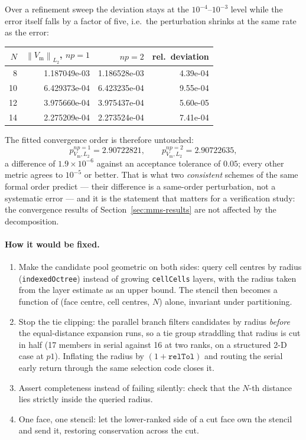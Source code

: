 \documentclass[11pt,a4paper]{article}
\newcommand{\code}[1]{\texttt{\small #1}}
\newcommand{\Vm}{V_{\text{m}}}
\newcommand{\norm}[1]{\left\lVert #1 \right\rVert}
\begin{document}
Over a refinement sweep the deviation stays at the $10^{-4}$--$10^{-3}$ level
while the error itself falls by a factor of five, i.e.\ the perturbation
shrinks at the same rate as the error:

\begin{center}
\begin{tabular}{@{}rrrr@{}}
\toprule
$N$ & $\norm{\Vm}_{L_2}$, $np=1$ & $np=2$ & rel.\ deviation \\
\midrule
 8 & 1.187049e-03 & 1.186528e-03 & 4.39e-04 \\
10 & 6.429373e-04 & 6.423235e-04 & 9.55e-04 \\
12 & 3.975660e-04 & 3.975437e-04 & 5.60e-05 \\
14 & 2.275209e-04 & 2.273524e-04 & 7.41e-04 \\
\bottomrule
\end{tabular}
\end{center}

The fitted convergence order is therefore untouched:
\[
  p^{np=1}_{\Vm,L_2} = 2.90722821,
  \qquad
  p^{np=2}_{\Vm,L_2} = 2.90722635,
\]
a difference of $1.9\times10^{-6}$ against an acceptance tolerance of $0.05$;
every other metric agrees to $10^{-5}$ or better. That is what two
\emph{consistent} schemes of the same formal order predict --- their difference
is a same-order perturbation, not a systematic error --- and it is the
statement that matters for a verification study: the convergence results of
Section~\ref{sec:mms-results} are not affected by the decomposition.

\paragraph{How it would be fixed.}
\begin{enumerate}
  \item Make the candidate pool geometric on both sides: query cell centres by
        radius (\code{indexedOctree}) instead of growing \code{cellCells}
        layers, with the radius taken from the layer estimate as an upper
        bound. The stencil then becomes a function of (face centre, cell
        centres, $N$) alone, invariant under partitioning.
  \item Stop the tie clipping: the parallel branch filters candidates by radius
        \emph{before} the equal-distance expansion runs, so a tie group
        straddling that radius is cut in half (17 members in serial against 16
        at two ranks, on a structured 2-D case at $p1$). Inflating the radius by
        $(1+\texttt{relTol})$ and routing the serial early return through the
        same selection code closes it.
  \item Assert completeness instead of failing silently: check that the $N$-th
        distance lies strictly inside the queried radius.
  \item One face, one stencil: let the lower-ranked side of a cut face own the
        stencil and send it, restoring conservation across the cut.
\end{enumerate}
\end{document}
